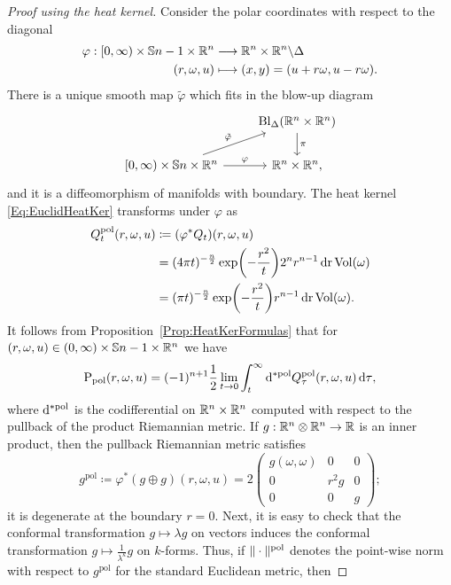 \documentclass[\MainFolder/Text.tex]{subfiles}
\begin{document}
\begin{proof}[Proof using the heat kernel]
Consider the polar coordinates with respect to the diagonal
$$ \begin{aligned}
   \varphi: [0,\infty)\times \mathbb{S}{n-1} \times \mathbb{R}^n &\longrightarrow \mathbb{R}^n \times \mathbb{R}^n \backslash \Delta \\ 
 (r,\omega,u) &\longmapsto (x,y) = (u+r\omega, u-r\omega).
   \end{aligned} $$
There is a unique smooth map $\tilde{\varphi}$ which fits in the blow-up diagram
$$\begin{tikzcd}
 & \Bl_\Diag(\R^n\times \R^n)\arrow{d}{\pi}\\{}
 [0,\infty)\times\Sph{n}\times\R^n\arrow{r}{\varphi}\arrow{ru}{\tilde{\varphi}}& \R^n\times \R^n,
\end{tikzcd}$$
and it is a diffeomorphism of manifolds with boundary. The heat kernel \eqref{Eq:EuclidHeatKer} transforms under $\varphi$ as
\begin{align*}
Q^{\mathrm{pol}}_t(r,\omega,u) &\coloneqq (\varphi^* Q_t)(r,\omega,u) \\
 & = (4 \pi t)^{-\frac{n}{2}} \exp(-\frac{r^2}{t}) 2^n r^{n-1} \operatorname{dr} \mathrm{Vol}(\omega) \\
 &= (\pi t)^{-\frac{n}{2}} \exp(-\frac{r^2}{t}) r^{n-1} \operatorname{dr} \mathrm{Vol}(\omega).
\end{align*}
It follows from Proposition~\ref{Prop:HeatKerFormulas} that for $(r,\omega,u)\in (0,\infty) \times \mathbb{S}{n-1}\times \mathbb{R}^n$ we have
\begin{equation}\label{Eq:StdPrpgPol}
\mathrm{P}_{\mathrm{pol}}(r,\omega,u) = (-1)^{n+1}\frac{1}{2}\lim_{t\to 0} \int_t^\infty \mathrm{d}^{*\mathrm{pol}} Q^{\mathrm{pol}}_\tau(r,\omega,u) \operatorname{d\tau},
\end{equation}
where $\mathrm{d}^{*\mathrm{pol}}$ is the codifferential on $\mathbb{R}^n\times \mathbb{R}^n$ computed with respect to the pullback of the product Riemannian metric. If $g: \mathbb{R}^n \otimes \mathbb{R}^n\rightarrow \mathbb{R}$ is an inner product, then the pullback Riemannian metric satisfies
\begin{equation}\label{Eq:PullbackMetric}
g^{\mathrm{pol}}\coloneqq \varphi^*(g\oplus g)(r,\omega,u) = 2\begin{pmatrix}
g(\omega,\omega) & 0 & 0 \\
0 & r^2 g & 0 \\
0 & 0 & g
\end{pmatrix};
\end{equation}
it is degenerate at the boundary $r=0$. Next, it is easy to check that the conformal transformation $g\mapsto\lambda g$ on vectors induces the conformal transformation $g\mapsto\frac{1}{\lambda^k}g$ on $k$-forms. Thus, if $\| \cdot \|^\mathrm{pol}$ denotes the point-wise norm with respect to $g^{\mathrm{pol}}$ for the standard Euclidean metric, then

\end{proof}
\end{document}
